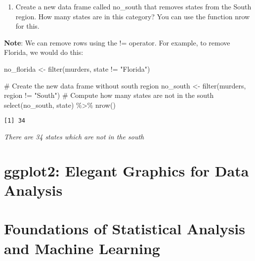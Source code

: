 \documentclass[
  letterpaper,
  DIV=11,
  numbers=noendperiod]{scrreprt}
\newenvironment{Shaded}{\begin{snugshade}}{\end{snugshade}}
\newcommand{\CommentTok}[1]{\textcolor[rgb]{0.37,0.37,0.37}{#1}}
\newcommand{\FunctionTok}[1]{\textcolor[rgb]{0.28,0.35,0.67}{#1}}
\newcommand{\NormalTok}[1]{\textcolor[rgb]{0.00,0.23,0.31}{#1}}
\newcommand{\OtherTok}[1]{\textcolor[rgb]{0.00,0.23,0.31}{#1}}
\newcommand{\SpecialCharTok}[1]{\textcolor[rgb]{0.37,0.37,0.37}{#1}}
\newcommand{\StringTok}[1]{\textcolor[rgb]{0.13,0.47,0.30}{#1}}
\providecommand{\tightlist}{%
  \setlength{\itemsep}{0pt}\setlength{\parskip}{0pt}}
\begin{document}
\begin{enumerate}
\def\labelenumi{\arabic{enumi}.}
\setcounter{enumi}{4}
\tightlist
\item
  Create a new data frame called no\_south that removes states from the
  South region. How many states are in this category? You can use the
  function nrow for this.
\end{enumerate}

\textbf{Note}: We can remove rows using the != operator. For example, to
remove Florida, we would do this:

\begin{Shaded}
\begin{Highlighting}[]
\NormalTok{no\_florida }\OtherTok{\textless{}{-}} \FunctionTok{filter}\NormalTok{(murders, state }\SpecialCharTok{!=} \StringTok{"Florida"}\NormalTok{)}
\end{Highlighting}
\end{Shaded}

\begin{Shaded}
\begin{Highlighting}[]
\CommentTok{\# Create the new data frame without south region}
\NormalTok{no\_south }\OtherTok{\textless{}{-}} \FunctionTok{filter}\NormalTok{(murders, region }\SpecialCharTok{!=} \StringTok{"South"}\NormalTok{)}
\CommentTok{\# Compute how many states are not in the south}
\FunctionTok{select}\NormalTok{(no\_south, state) }\SpecialCharTok{\%\textgreater{}\%} \FunctionTok{nrow}\NormalTok{()}
\end{Highlighting}
\end{Shaded}

\begin{verbatim}
[1] 34
\end{verbatim}

\emph{There are 34 states which are not in the south}

\part{ggplot2: Elegant Graphics for Data Analysis}

\chapter{}\label{section}

\part{Foundations of Statistical Analysis and Machine Learning}
\end{document}
